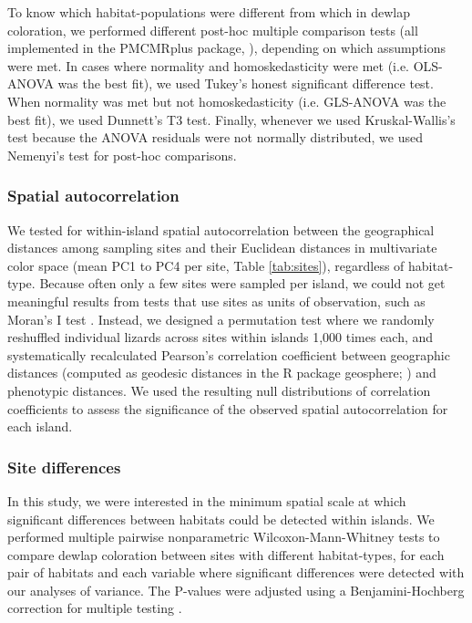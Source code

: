 To know which habitat-populations were different from which in dewlap coloration, we performed different post-hoc multiple comparison tests (all implemented in the PMCMRplus package, \citealp{Pohlert2020}), depending on which assumptions were met. In cases where normality and homoskedasticity were met (i.e. OLS-ANOVA was the best fit), we used Tukey's honest significant difference test. When normality was met but not homoskedasticity (i.e. GLS-ANOVA was the best fit), we used Dunnett's T3 test. Finally, whenever we used Kruskal-Wallis's test because the ANOVA residuals were not normally distributed, we used Nemenyi's test for post-hoc comparisons.

\subsubsection*{Spatial autocorrelation}

We tested for within-island spatial autocorrelation between the geographical distances among sampling sites and their Euclidean distances in multivariate color space (mean PC1 to PC4 per site, Table \ref{tab:sites}), regardless of habitat-type. Because often only a few sites were sampled per island, we could not get meaningful results from tests that use sites as units of observation, such as Moran's I test \citep{Gittleman1990}. Instead, we designed a permutation test where we randomly reshuffled individual lizards across sites within islands 1,000 times each, and systematically recalculated Pearson's correlation coefficient between geographic distances (computed as geodesic distances in the R package geosphere; \citealt{Hijmans2019}) and phenotypic distances. We used the resulting null distributions of correlation coefficients to assess the significance of the observed spatial autocorrelation for each island.

\subsubsection*{Site differences}

In this study, we were interested in the minimum spatial scale at which significant differences between habitats could be detected within islands. We performed multiple pairwise nonparametric Wilcoxon-Mann-Whitney tests \citep{Hollander2013} to compare dewlap coloration between sites with different habitat-types, for each pair of habitats and each variable where significant differences were detected with our analyses of variance. The P-values were adjusted using a Benjamini-Hochberg correction for multiple testing \citep{Benjamini1995}.